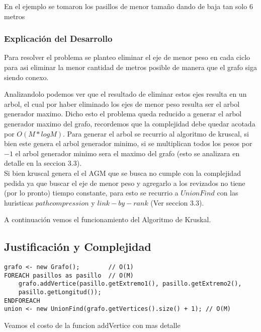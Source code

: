      
     
    En el ejemplo se tomaron los pasillos de menor tamaño dando de baja tan solo 6 metros\endl
        
\subsubsection{Explicaci\'on del Desarrollo}
    Para resolver el problema se planteo eliminar el eje de menor peso en cada ciclo para asi eliminar la menor cantidad de metros posible de manera que el grafo siga siendo conexo. 
    
    Analizandolo podemos ver que el resultado de eliminar estos ejes resulta en un arbol, el cual por haber eliminado los ejes de menor peso resulta ser el arbol generador maximo. Dicho esto el problema queda reducido a generar el arbol generador maximo del grafo, recordemos que la complejidad debe quedar acotada por $O(M * log M)$. Para generar el arbol se recurrio al algoritmo de kruscal, si bien este genera el arbol generador minimo, si se multiplican todos los pesos por $-1$ el arbol generador minimo sera el maximo del grafo (esto se analizara en detalle en la seccion $3.3$).\\
    
    Si bien kruscal genera el el AGM que se busca no cumple con la complejidad pedida ya que buscar el eje de menor peso y agregarlo a los revizados no tiene (por lo pronto) tiempo constante, para esto se recurrio a $Union Find$ con las huristicas $path compression$ y $link-by-rank$ (Ver seccion $3.3$).
    
    A continuaci\'on vemos el funcionamiento del Algoritmo de Kruskal.
    

\subsection{Justificaci\'on y Complejidad}

\begin{lstlisting}
grafo <- new Grafo();        // O(1)
FOREACH pasillos as pasillo  // O(M)
    grafo.addVertice(pasillo.getExtremo1(), pasillo.getExtremo2(),
    pasillo.getLongitud());
ENDFOREACH
union <- new UnionFind(grafo.getVertices().size() + 1); // O(M)
\end{lstlisting}


Veamos el costo de la funcion addVertice con mas detalle 

